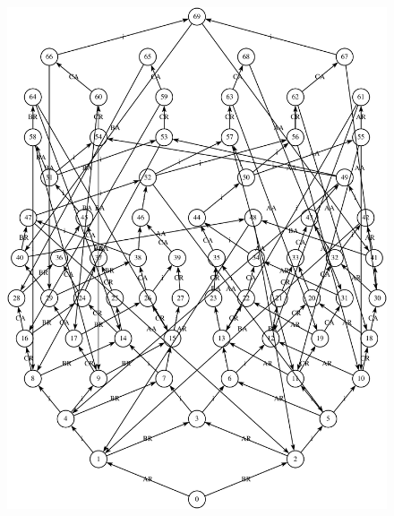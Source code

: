 \documentclass[12pt, a4paper, notitlepage]{article}
\begin{document}
\begin{figure}[!htb]
	\centering
	\begin{minipage}{\linewidth}
	\includegraphics[angle=-90,scale=0.65]{mixer1}
	\end{minipage}
\end{figure}
\end{document}
